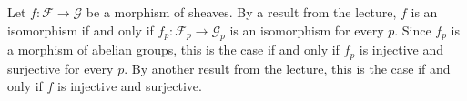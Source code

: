 Let $f\colon \mathcal{F}\to \mathcal{G}$ be a morphism of sheaves.
By a result from the lecture, $f$ is an isomorphism if and only if
$f_p\colon \mathcal{F}_p\to \mathcal{G}_p$ is an isomorphism for every $p$.
Since $f_p$ is a morphism of abelian groups, this is the case if and only if $f_p$
is injective and surjective for every $p$. By another result from the lecture,
this is the case if and only if $f$ is injective and surjective.
